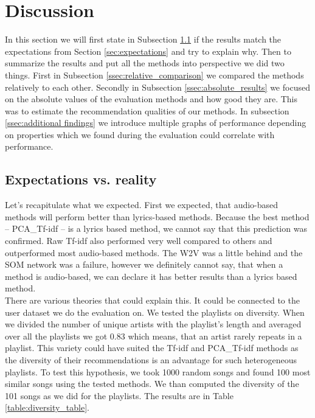 \section{Discussion}\label{sec:discussion}
In this section we will first state in Subsection \ref{ssec:exp_vs_reality} if the results match the expectations from Section \ref{sec:expectations} and try to explain why. Then to summarize the results and put all the methods into perspective we did two things. First in Subsection \ref{ssec:relative_comparison} we compared the methods relatively to each other. Secondly in Subsection \ref{ssec:absolute_results} we focused on the absolute values of the evaluation methods and how good they are. This was to estimate the recommendation qualities of our methods. In subsection \ref{ssec:additional findings} we introduce multiple graphs of performance depending on properties which we found during the evaluation could correlate with performance. \\

\subsection{Expectations vs. reality}\label{ssec:exp_vs_reality}
Let's recapitulate what we expected. First we expected, that audio-based methods will perform better than lyrics-based methods. Because the best method -- PCA\_Tf-idf -- is a lyrics based method, we cannot say that this prediction was confirmed. Raw Tf-idf also performed very well compared to others and outperformed most audio-based methods.  The W2V was a little behind and the SOM network was a failure, however we definitely cannot say, that when a method is audio-based, we can declare it has better results than a lyrics based method. \\
There are various theories that could explain this. It could be connected to the user dataset we do the evaluation on. We tested the playlists on diversity. When we divided the number of unique artists with the playlist's length and averaged over all the playlists we got 0.83 which means, that an artist rarely repeats in a playlist. This variety could have suited the Tf-idf and PCA\_Tf-idf methods as the diversity of their recommendations is an advantage for such heterogeneous playlists. To test this hypothesis, we took 1000 random songs and found 100 most similar songs using the tested methods. We than computed the diversity of the 101 songs as we did for the playlists. The results are in Table \ref{table:diversity_table}. \\

